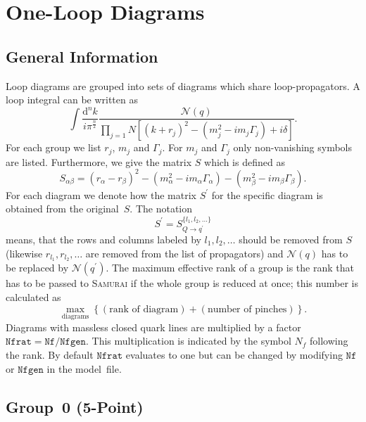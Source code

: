 \documentclass[a4paper]{article}
\begin{document}
\section{One-Loop Diagrams}
\subsection*{General Information}


Loop diagrams are grouped into sets of diagrams which share
loop-propagators. A loop integral can be written as
\begin{equation}
\int\!\frac{\mathrm{d}^nk}{i\pi^{\frac{n}{2}}}%
\frac{\mathcal{N}(q)}{\prod_{j=1}{N}\left[(k+r_j)^2-(m_j^2
   -i m_j\Gamma_j) + i\delta\right]}.
\end{equation}
For each group we list $r_j$, $m_j$ and $\Gamma_j$.
For $m_j$ and $\Gamma_j$ only non-vanishing symbols are listed.
Furthermore, we give the matrix $S$ which is defined as
\begin{equation}
S_{\alpha\beta} = (r_\alpha-r_\beta)^2
-(m_\alpha^2-im_\alpha\Gamma_\alpha)
-(m_\beta^2-im_\beta\Gamma_\beta).
\end{equation}
For each diagram we denote how the matrix $S^\prime$ for the specific diagram
is obtained from the original~$S$. The notation
\begin{equation}
S^\prime=S_{Q\to q^\prime}^{\{l_1,l_2,\ldots\}}
\end{equation}
means, that the rows and columns labeled by $l_1,l_2,\ldots$ should be
removed from $S$ (likewise $r_{l_1}, r_{l_2}, \ldots$ are removed from the
list of propagators) and $\mathcal{N}(q)$ has to be replaced by
$\mathcal{N}(q^\prime)$.
The maximum effective rank of a group is the rank that has to be passed
to \textsc{Samurai} if the whole group is reduced at once; this number
is calculated as
\begin{equation}
\max_{\text{diagrams}}\left\{(\text{rank of diagram})+
(\text{number of pinches})\right\}.
\end{equation}
Diagrams with massless closed quark lines are multiplied by a factor
$\mathtt{Nfrat}=\mathtt{Nf}/\mathtt{Nfgen}$. This multiplication is indicated
by the symbol $N_f$ following the rank. By default $\mathtt{Nfrat}$ evaluates
to one but can be changed by modifying $\mathtt{Nf}$ or $\mathtt{Nfgen}$ in the
model~file.


\subsection{Group~0 (5-Point)}
\end{document}
